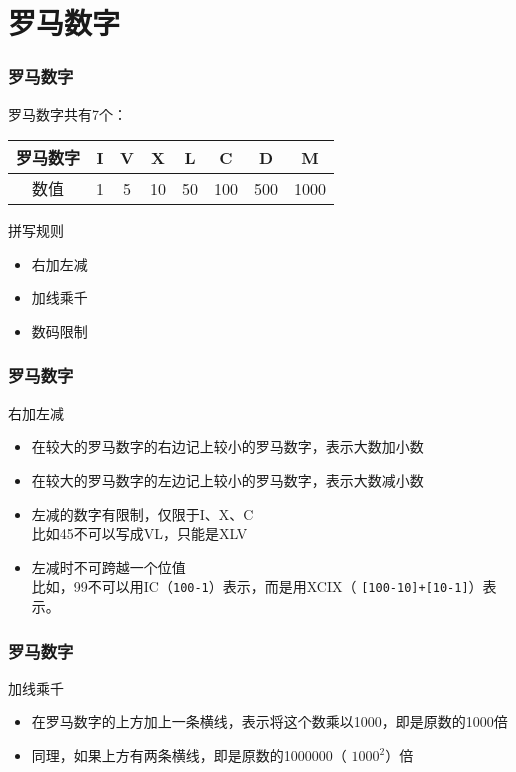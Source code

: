 \section{罗马数字}

\begin{frame}\frametitle{罗马数字}
	罗马数字共有7个：\\
	\vspace{0.5em}
	\renewcommand{\arraystretch}{1.5}
	\begin{tabular}{| *{8}{c|}}
		\hline
		罗马数字 & \alert{I} & \alert{V} & \alert{X} & \alert{L} & \alert{C} & \alert{D} & \alert{M} \\ \hline
		数值 & 1 & 5 & 10 & 50 & 100 & 500 & 1000 \\ \hline
	\end{tabular}\pause
	\begin{block}{拼写规则}
		\begin{itemize}
			\item 右加左减
			\item 加线乘千
			\item 数码限制 
		\end{itemize}
	\end{block}
\end{frame}

\begin{frame}\frametitle{罗马数字}
	\begin{block}{右加左减}\pause
		\begin{itemize}[<+- | alert@+>]
			\item 在较大的罗马数字的右边记上较小的罗马数字，表示大数加小数
			\item 在较大的罗马数字的左边记上较小的罗马数字，表示大数减小数
			\item 左减的数字有限制，仅限于I、X、C\\
				比如45不可以写成VL，只能是XLV
			\item 左减时不可跨越一个位值\\
				比如，99不可以用IC（\texttt{100-1}）表示，而是用XCIX（ \texttt{[100-10]+[10-1]}）表示。
		\end{itemize}
	\end{block}
\end{frame}

\begin{frame}\frametitle{罗马数字}
	\begin{block}{加线乘千}\pause
		\begin{itemize}[<+-| alert@+>]
			\item 在罗马数字的上方加上一条横线，表示将这个数乘以1000，即是原数的1000倍
			\item 同理，如果上方有两条横线，即是原数的1000000（ $1000^2$）倍
		\end{itemize}
	\end{block}
\end{frame}

